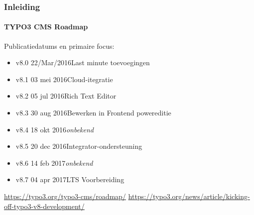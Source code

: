 \begin{frame}[fragile]
	\frametitle{Inleiding}
	\framesubtitle{TYPO3 CMS Roadmap}

	Publicatiedatums en primaire focus:

	\begin{itemize}

		\item
			\begingroup
				\color{typo3orange}
					v8.0 \tabto{1.1cm}22/Mar/2016\tabto{3.4cm}Last minute toevoegingen
			\endgroup
		\item v8.1 \tabto{1.1cm}03 mei 2016\tabto{3.4cm}Cloud-itegratie
		\item v8.2 \tabto{1.1cm}05 jul 2016\tabto{3.4cm}Rich Text Editor
		\item v8.3 \tabto{1.1cm}30 aug 2016\tabto{3.4cm}Bewerken in Frontend powereditie
		\item v8.4 \tabto{1.1cm}18 okt 2016\tabto{3.4cm}\textit{onbekend}
		\item v8.5 \tabto{1.1cm}20 dec 2016\tabto{3.4cm}Integrator-ondersteuning
		\item v8.6 \tabto{1.1cm}14 feb 2017\tabto{3.4cm}\textit{onbekend}
		\item v8.7 \tabto{1.1cm}04 apr 2017\tabto{3.4cm}LTS Voorbereiding

	\end{itemize}

	\smaller
		\url{https://typo3.org/typo3-cms/roadmap/}\newline
		\url{https://typo3.org/news/article/kicking-off-typo3-v8-development/}
	\normalsize

\end{frame}

